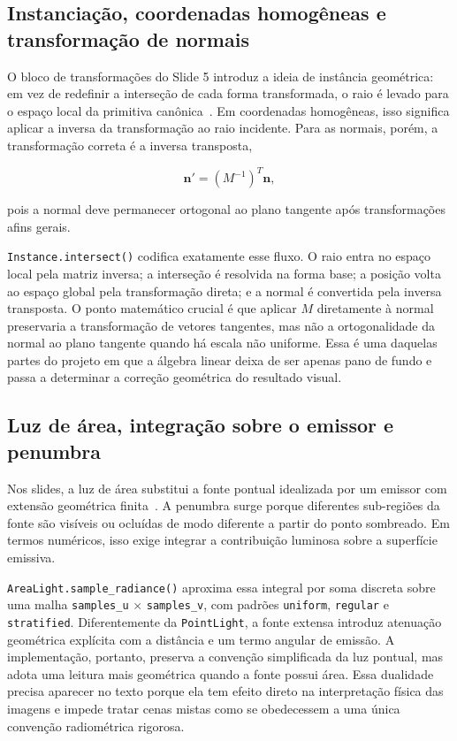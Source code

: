\documentclass[portuguese]{sbcreviews-2025}%
\makeatletter
\newcommand{\slideurl}[1]{%
    \ifcsname slideurl@#1\endcsname
        \csname slideurl@#1\endcsname
    \else
        #1
    \fi
}
\newcommand{\slidescite}[2]{\citep[\href{\slideurl{#1}}{pp.~#2}]{#1}}
\makeatother
\begin{document}
\subsection{Instanciação, coordenadas homogêneas e transformação de normais}
\label{sec:instancia-v3}

O bloco de transformações do Slide 5 introduz a ideia de instância geométrica: em vez de redefinir a interseção de cada forma transformada, o raio é levado para o espaço local da primitiva canônica~\slidescite{inf2608slides05}{9--13}. Em coordenadas homogêneas, isso significa aplicar a inversa da transformação ao raio incidente. Para as normais, porém, a transformação correta é a inversa transposta,

\[
\mathbf{n}' = (M^{-1})^{T}\mathbf{n},
\]

pois a normal deve permanecer ortogonal ao plano tangente após transformações afins gerais.

\texttt{Instance.intersect()} codifica exatamente esse fluxo. O raio entra no espaço local pela matriz inversa; a interseção é resolvida na forma base; a posição volta ao espaço global pela transformação direta; e a normal é convertida pela inversa transposta. O ponto matemático crucial é que aplicar \(M\) diretamente à normal preservaria a transformação de vetores tangentes, mas não a ortogonalidade da normal ao plano tangente quando há escala não uniforme. Essa é uma daquelas partes do projeto em que a álgebra linear deixa de ser apenas pano de fundo e passa a determinar a correção geométrica do resultado visual.

\subsection{Luz de área, integração sobre o emissor e penumbra}
\label{sec:arealight-v3}

Nos slides, a luz de área substitui a fonte pontual idealizada por um emissor com extensão geométrica finita~\slidescite{inf2608slides05}{14--23}. A penumbra surge porque diferentes sub-regiões da fonte são visíveis ou ocluídas de modo diferente a partir do ponto sombreado. Em termos numéricos, isso exige integrar a contribuição luminosa sobre a superfície emissiva.

\texttt{AreaLight.sample\_radiance()} aproxima essa integral por soma discreta sobre uma malha \texttt{samples\_u} \(\times\) \texttt{samples\_v}, com padrões \texttt{uniform}, \texttt{regular} e \texttt{stratified}. Diferentemente da \texttt{PointLight}, a fonte extensa introduz atenuação geométrica explícita com a distância e um termo angular de emissão. A implementação, portanto, preserva a convenção simplificada da luz pontual, mas adota uma leitura mais geométrica quando a fonte possui área. Essa dualidade precisa aparecer no texto porque ela tem efeito direto na interpretação física das imagens e impede tratar cenas mistas como se obedecessem a uma única convenção radiométrica rigorosa.
\end{document}
